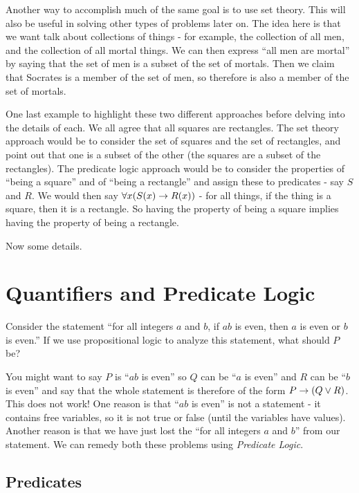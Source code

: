 \documentclass[12pt]{article}
\begin{document}
Another way to accomplish much of the same goal is to use set theory.  This will also be useful in solving other types of problems later on.  The idea here is that we want talk about collections of things - for example, the collection of all men, and the collection of all mortal things.  We can then express ``all men are mortal'' by saying that the set of men is a subset of the set of mortals.  Then we claim that Socrates is a member of the set of men, so therefore is also a member of the set of mortals.

One last example to highlight these two different approaches before delving into the details of each.  We all agree that all squares are rectangles.  The set theory approach would be to consider the set of squares and the set of rectangles, and point out that one is a subset of the other (the squares are a subset of the rectangles).  The predicate logic approach would be to consider the properties of ``being a square'' and of ``being a rectangle'' and assign these to predicates - say $S$ and $R$.  We would then say $\forall x (S(x) \rightarrow R(x))$ - for all things, if the thing is a square, then it is a rectangle.  So having the property of being a square implies having the property of being a rectangle.

Now some details.




\section{Quantifiers and Predicate Logic}

Consider the statement ``for all integers $a$ and $b$, if $ab$ is even, then $a$ is even or $b$ is even.''  If we use propositional logic to analyze this statement, what should $P$ be?  

You might want to say $P$ is ``$ab$ is even'' so $Q$ can be ``$a$ is even'' and $R$ can be ``$b$ is even'' and say that the whole statement is therefore of the form $P \rightarrow (Q \vee R)$.  This does not work!  One reason is that ``$ab$ is even'' is not a statement - it contains free variables, so it is not true or false (until the variables have values).  Another reason is that we have just lost the ``for all integers $a$ and $b$'' from our statement.  We can remedy both these problems using {\em Predicate Logic}.

\subsection{Predicates}
\end{document}
